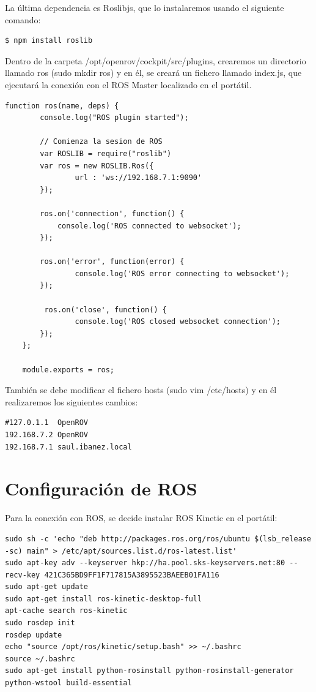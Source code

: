 La última dependencia es Roslibjs, que lo instalaremos usando el siguiente comando: 
\renewcommand{\lstlistingname}{}
\begin{lstlisting}[caption=Roslib, label={lst:roslib}]
$ npm install roslib
\end{lstlisting}

Dentro de la carpeta /opt/openrov/cockpit/src/plugins, crearemos un directorio llamado ros (sudo mkdir ros) y en él, se creará un fichero llamado index.js, que ejecutará la conexión con el ROS Master localizado en el portátil.
\newpage
\renewcommand{\lstlistingname}{}
\begin{lstlisting}[caption=Conexión con ROS, label={lst:conection_ros}]
function ros(name, deps) {
  		console.log("ROS plugin started");

  		// Comienza la sesion de ROS
 		var ROSLIB = require("roslib")
  		var ros = new ROSLIB.Ros({
    			url : 'ws://192.168.7.1:9090'
  		});

  		ros.on('connection', function() {
   			console.log('ROS connected to websocket');
  		});

  		ros.on('error', function(error) {
    			console.log('ROS error connecting to websocket');
  		});

 		 ros.on('close', function() {
    			console.log('ROS closed websocket connection');
 		});
	};

	module.exports = ros;
\end{lstlisting}

También se debe modificar el fichero hosts (sudo vim /etc/hosts) y en él realizaremos los siguientes cambios:

\begin{lstlisting}[caption=/etc/hosts, label={lst:hosts}]
#127.0.1.1	OpenROV
192.168.7.2	OpenROV
192.168.7.1	saul.ibanez.local
\end{lstlisting}

\section{Configuración de ROS}
\label{cap:Configuracion de ROS}
Para la conexión con ROS, se decide instalar ROS Kinetic en el portátil:

\begin{lstlisting}[caption=Instalacion de ROS, label={lst:install_ros}]
sudo sh -c 'echo "deb http://packages.ros.org/ros/ubuntu $(lsb_release -sc) main" > /etc/apt/sources.list.d/ros-latest.list'
sudo apt-key adv --keyserver hkp://ha.pool.sks-keyservers.net:80 --recv-key 421C365BD9FF1F717815A3895523BAEEB01FA116
sudo apt-get update
sudo apt-get install ros-kinetic-desktop-full
apt-cache search ros-kinetic
sudo rosdep init
rosdep update
echo "source /opt/ros/kinetic/setup.bash" >> ~/.bashrc
source ~/.bashrc
sudo apt-get install python-rosinstall python-rosinstall-generator python-wstool build-essential
\end{lstlisting}

